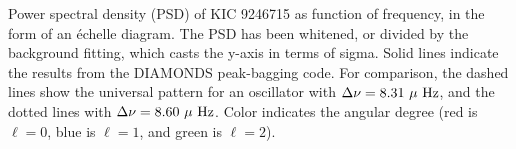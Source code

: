 \label{fig:appendixfig}
Power spectral density (PSD) of KIC 9246715 as function of frequency, in the form of an \'echelle diagram. The PSD has been whitened, or divided by the background fitting, which casts the y-axis in terms of sigma. Solid lines indicate the results from the DIAMONDS peak-bagging code. For comparison, the dashed lines show the universal pattern for an oscillator with $\Delta \nu = 8.31 \ \mu \ \rm{Hz}$, and the dotted lines with $\Delta \nu = 8.60 \ \mu \ \rm{Hz}$. Color indicates the angular degree (red is $\ell=0$, blue is $\ell=1$, and green is $\ell=2$).